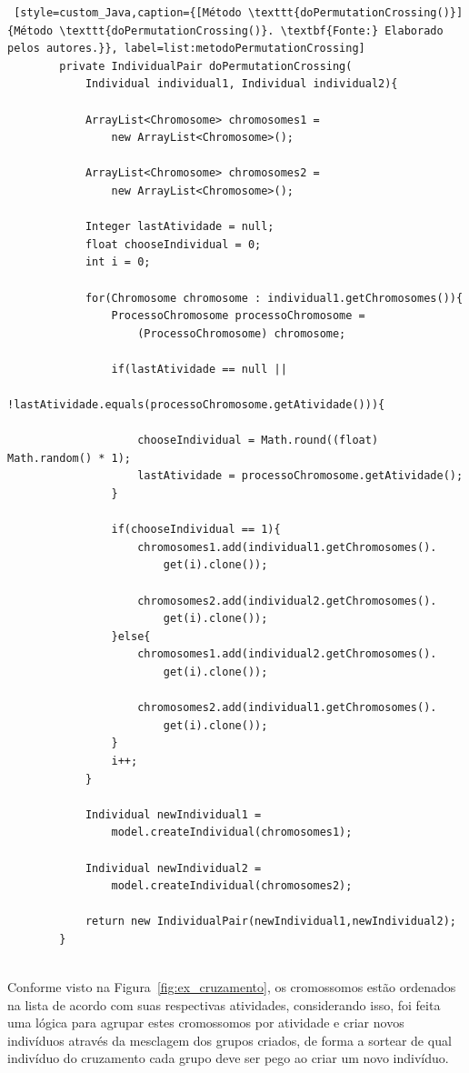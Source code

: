 \begin{lstlisting} [style=custom_Java,caption={[Método \texttt{doPermutationCrossing()}]{Método \texttt{doPermutationCrossing()}. \textbf{Fonte:} Elaborado pelos autores.}}, label=list:metodoPermutationCrossing] 
		private IndividualPair doPermutationCrossing(
			Individual individual1, Individual individual2){
			
			ArrayList<Chromosome> chromosomes1 = 
				new ArrayList<Chromosome>();
				
			ArrayList<Chromosome> chromosomes2 = 
				new ArrayList<Chromosome>();
				
			Integer lastAtividade = null;
			float chooseIndividual = 0;
			int i = 0;
			
			for(Chromosome chromosome : individual1.getChromosomes()){
				ProcessoChromosome processoChromosome = 
					(ProcessoChromosome) chromosome;
				
				if(lastAtividade == null || 
					!lastAtividade.equals(processoChromosome.getAtividade())){
					
					chooseIndividual = Math.round((float) Math.random() * 1);
					lastAtividade = processoChromosome.getAtividade();
				}
				
				if(chooseIndividual == 1){
					chromosomes1.add(individual1.getChromosomes().
						get(i).clone());
						
					chromosomes2.add(individual2.getChromosomes().
						get(i).clone());
				}else{
					chromosomes1.add(individual2.getChromosomes().
						get(i).clone());
						
					chromosomes2.add(individual1.getChromosomes().
						get(i).clone());
				}
				i++;
			}
			
			Individual newIndividual1 = 
				model.createIndividual(chromosomes1);
				
			Individual newIndividual2 = 
				model.createIndividual(chromosomes2);
			
			return new IndividualPair(newIndividual1,newIndividual2);
		}
	

\end{lstlisting}

\par Conforme visto na Figura~\ref{fig:ex_cruzamento}, os cromossomos estão ordenados na lista de acordo com suas respectivas atividades, considerando isso, foi feita uma lógica para agrupar estes cromossomos por atividade e criar novos indivíduos através da mesclagem dos grupos criados, de forma a sortear de qual indivíduo do cruzamento cada grupo deve ser pego ao criar um novo indivíduo. 

